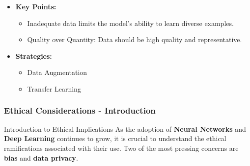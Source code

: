 \documentclass{beamer}
\begin{document}
\begin{frame}[fragile]
    \begin{itemize}
        \item \textbf{Key Points:}
        \begin{itemize}
            \item Inadequate data limits the model's ability to learn diverse examples.
            \item Quality over Quantity: Data should be high quality and representative.
        \end{itemize}
        \item \textbf{Strategies:}
        \begin{itemize}
            \item Data Augmentation
            \item Transfer Learning
        \end{itemize}
    \end{itemize}
\end{frame}

\begin{frame}[fragile]
    \frametitle{Ethical Considerations - Introduction}
    \begin{block}{Introduction to Ethical Implications}
        As the adoption of \textbf{Neural Networks} and \textbf{Deep Learning} continues to grow, it is crucial to understand the ethical ramifications associated with their use. 
        Two of the most pressing concerns are \textbf{bias} and \textbf{data privacy}.
    \end{block}
\end{frame}
\end{document}
